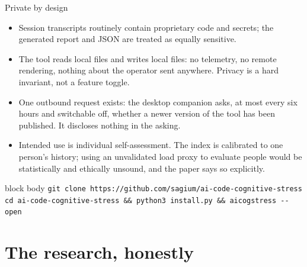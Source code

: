 \documentclass[aspectratio=169,10pt]{beamer}
\newcommand{\good}[1]{\textcolor{Sage}{#1}}
\newcommand{\repourl}{https://github.com/sagium/ai-code-cognitive-stress}
\begin{document}
\begin{frame}{Private by design}
  \begin{itemize}
    \item Session transcripts routinely contain \alert{proprietary code and
          secrets}; the generated report and JSON are treated as equally
          sensitive.
    \item The tool reads local files and writes local files: \good{no
          telemetry}, no remote rendering, nothing about the operator sent
          anywhere. Privacy is a hard invariant, not a feature toggle.
    \item One outbound request exists: the desktop companion asks, at most
          every six hours and switchable off, whether a \good{newer version}
          of the tool has been published. It discloses nothing in the asking.
    \item Intended use is \good{individual self-assessment}. The index is
          calibrated to one person's history; using an unvalidated load
          proxy to evaluate people would be statistically and ethically
          unsound, and the paper says so explicitly.
  \end{itemize}
  \vspace{2mm}
  \begin{beamercolorbox}[rounded=true,sep=6pt]{block body}
    \footnotesize\texttt{git clone \repourl{}\\
    cd ai-code-cognitive-stress \&\& python3 install.py \&\& aicogstress -{}-open}
  \end{beamercolorbox}
\end{frame}

\section{The research, honestly}
\end{document}

